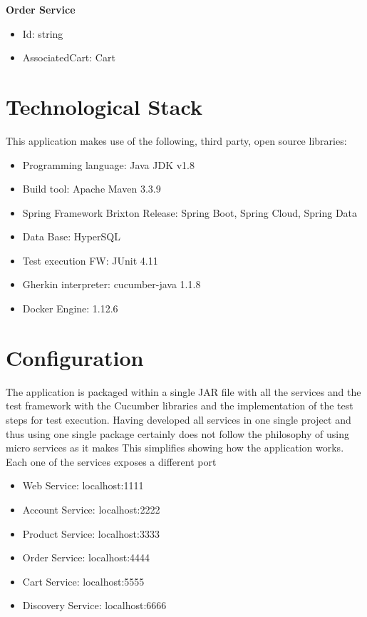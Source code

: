 \textbf{Order Service}
\begin{itemize}
\item Id: string
\item AssociatedCart: Cart\\
\end{itemize}


\section{Technological Stack}
This application makes use of the following, third party, open source libraries:

\begin{itemize}
\item Programming language: Java JDK v1.8
\item Build tool: Apache Maven 3.3.9
\item Spring Framework Brixton Release: Spring Boot, Spring Cloud, Spring Data
\item Data Base: HyperSQL
\item Test execution FW: JUnit 4.11
\item Gherkin interpreter: cucumber-java 1.1.8
\item Docker Engine: 1.12.6
\end{itemize}


\section{Configuration}
The application is packaged within a single JAR file with all the services and the test framework with the Cucumber libraries and the implementation of the test steps for test execution. Having developed all services in one single project and thus using one single package certainly does not follow the philosophy of using micro services as it makes This simplifies showing how the application works. Each one of the services exposes a different port

\begin{itemize}
\item Web Service: 				localhost:1111
\item Account Service: 		localhost:2222
\item Product Service: 		localhost:3333
\item Order Service: 			localhost:4444
\item Cart Service: 			localhost:5555
\item Discovery Service: 	localhost:6666
\end{itemize}


